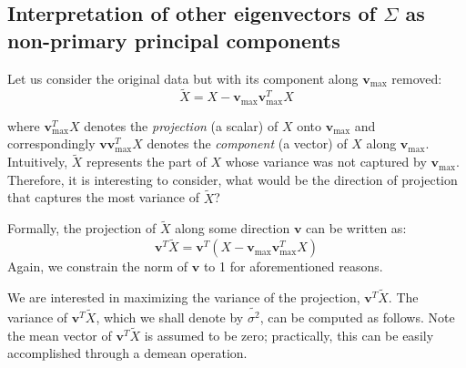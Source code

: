 \documentclass{article}
\newcommand{\vecv}{\boldsymbol{v}}
\begin{document}
\subsection{Interpretation of other eigenvectors of $\Sigma$ as non-primary principal components}

Let us consider the original data but with its component along $\vecv_{\max}$ removed:
$$\tilde{X} = X - \vecv_{\max} \vecv_{\max}^T X$$

where $\vecv_{\max}^T X$ denotes the \textit{projection} (a scalar) of $X$ onto $\vecv_{\max}$ and correspondingly $\vecv \vecv_{\max}^T X$ denotes the \textit{component} (a vector) of $X$ along $\vecv_{\max}$. Intuitively, $\tilde{X}$ represents the part of $X$ whose variance was not captured by $\vecv_{\max}$. Therefore, it is interesting to consider, what would be the direction of projection that captures the most variance of $\tilde{X}$?

\vspace{3mm}
Formally, the projection of $\tilde{X}$ along some direction $\vecv$ can be written as:
$$\vecv^T \tilde{X} = \vecv^T (X - \vecv_{\max} \vecv_{\max}^T X)$$
Again, we constrain the norm of $\vecv$ to 1 for aforementioned reasons.

\vspace{3mm}
We are interested in maximizing the variance of the projection, $\vecv^T \tilde{X}$. The variance of $\vecv^T \tilde{X}$, which we shall denote by $\tilde{\sigma^2}$, can be computed as follows. Note the mean vector of $\vecv^T \tilde{X}$ is assumed to be zero; practically, this can be easily accomplished through a demean operation.
\end{document}
